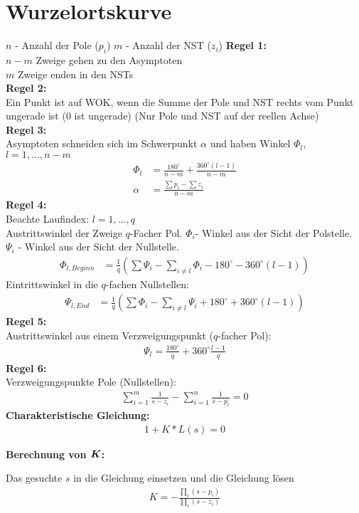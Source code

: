 	\section{Wurzelortskurve}
\begin{tcolorbox}[colback=white!10!white,colframe=blue!50!white,title=Konstruktionsregeln]
	$n$ - Anzahl der Pole ($p_i$)\hspace{1cm}
	$m$ - Anzahl der NST ($z_i$)
	\tcblower  %
	\textbf{Regel 1:}\\
	$n-m$ Zweige gehen zu den  Asymptoten\\
	$m$ Zweige enden in den NSTs\\

	\textbf{Regel 2:}\\
		Ein Punkt ist auf WOK, wenn die Summe der Pole und NST rechts vom Punkt ungerade ist (0 ist ungerade) (Nur Pole und NST auf der reellen Achse)\\
		
	\textbf{Regel 3:}\\
	Asymptoten schneiden sich im Schwerpunkt $\alpha$ und haben Winkel $\Phi_l$, $l =1,\dots,n-m$
	\begin{align*}
		\Phi_l &= \frac{180^\circ}{n-m}+\frac{360^\circ(l-1)}{n-m}\\
		\alpha &=	\frac{\sum p_i - \sum z_i}{n-m}
	\end{align*}
		\textbf{Regel 4:}\\
		Beachte Laufindex: $l=1,\dots,q$\\
		Austrittswinkel  der Zweige $q$-Facher Pol. $\Phi_i$- Winkel aus der Sicht der Polstelle. $\Psi_i$ - Winkel aus der Sicht der Nullstelle.
		\begin{align*}
			\Phi_{l,Beginn} &= \frac{1}{q}\left (\sum\Psi_i-\sum_{i\not= l}\Phi_i-180^\circ-360^\circ(l-1)\right )
		\end{align*}
		Eintrittswinkel in die $q$-fachen Nullstellen:
		\begin{align*}
			\Psi_{l,End} &= \frac{1}{q}\left (\sum\Phi_i-\sum_{i\not= l}\Psi_i+180^\circ+360^\circ(l-1)\right )
		\end{align*}
		\textbf{Regel 5:}\\
		Austrittswinkel aus einem Verzweigungspunkt ($q$-facher Pol):
		\begin{align*}
			\Psi_l = \frac{180^\circ}{q}+360^\circ\frac{l-1}{q}
		\end{align*}
		\textbf{Regel 6:}\\
		Verzweigungspunkte Pole (Nullstellen):
		\begin{align*}
			\sum_{i=1}^{m}\frac{1}{s-z_i}-\sum_{i=1}^{n}\frac{1}{s-p_i} =0
		\end{align*}
		\textbf{Charakteristische Gleichung:}
		\begin{align*}
			1+ K*L(s) = 0
		\end{align*}
		
		\textbf{Berechnung von $\boldsymbol{K}$:}
		
		Das gesuchte $s$ in die Gleichung einsetzen und die Gleichung lösen
		\begin{align*}
			K = -\frac{\prod_{i}(s-p_i)}{\prod_{i}(s-z_i)}
		\end{align*}
\end{tcolorbox}